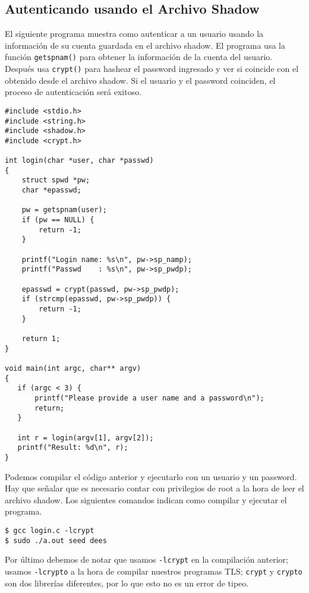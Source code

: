 \subsection{Autenticando usando el Archivo Shadow}
\label{vpn:subsec:auth}

El siguiente programa muestra como autenticar a un usuario usando la información de su cuenta guardada en el archivo shadow.
El programa usa la función \texttt{getspnam()} para obtener la información de la cuenta del usuario. Después usa \texttt{crypt()} para hashear el password ingresado y ver si coincide con el obtenido desde el archivo shadow. Si el usuario y el password coinciden, el proceso de autenticación será exitoso.

\begin{lstlisting}
#include <stdio.h>
#include <string.h>
#include <shadow.h>
#include <crypt.h>

int login(char *user, char *passwd)
{
    struct spwd *pw;
    char *epasswd;

    pw = getspnam(user);
    if (pw == NULL) {
        return -1;
    }

    printf("Login name: %s\n", pw->sp_namp);
    printf("Passwd    : %s\n", pw->sp_pwdp);

    epasswd = crypt(passwd, pw->sp_pwdp);
    if (strcmp(epasswd, pw->sp_pwdp)) {
        return -1;
    }

    return 1;
}

void main(int argc, char** argv)
{
   if (argc < 3) {
       printf("Please provide a user name and a password\n");
       return;
   }

   int r = login(argv[1], argv[2]);
   printf("Result: %d\n", r);
}
\end{lstlisting}

Podemos compilar el código anterior y ejecutarlo con un usuario y un password.
Hay que señalar que es necesario contar con privilegios de root a la hora de leer el archivo shadow. Los siguientes comandos indican como compilar y ejecutar el programa.

\begin{lstlisting}
$ gcc login.c -lcrypt
$ sudo ./a.out seed dees
\end{lstlisting}
 
Por último debemos de notar que usamos \texttt{-lcrypt} en la compilación anterior; usamos \texttt{-lcrypto} a la hora de compilar nuestros programas TLS; \texttt{crypt} y \texttt{crypto} son dos librerías diferentes, por lo que esto no es un error de tipeo.


